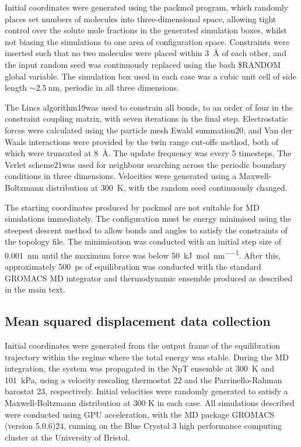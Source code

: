 Initial coordinates were generated using the packmol program, which randomly places set numbers of molecules into three-dimensional space, allowing tight control over the solute mole fractions in the generated simulation boxes, whilst not biasing the simulations to one area of configuration space. Constraints were inserted such that no two molecules were placed within \SI{3}{\angstrom} of each other, and the input random seed was continuously replaced using the bash \$RANDOM global variable. The simulation box used in each case was a cubic unit cell of side length $\sim \SI{2.5}{\nano\meter}$, periodic in all three dimensions.

The Lincs algorithm19was used to constrain all bonds, to an order of four in the constraint coupling matrix, with seven iterations in the final step. Electrostatic forces were calculated using the particle mesh Ewald summation20, and Van der Waals interactions were provided by the twin range cut-offs method, both of which were truncated at \SI{8}{\angstrom}. The update frequency was every 5 timesteps. The Verlet scheme21was used for neighbour searching across the periodic boundary conditions in three dimensions. Velocities were generated using a Maxwell-Boltzmann distribution at \SI{300}{\kelvin}, with the random seed continuously changed. 

The starting coordinates produced by packmol are not suitable for MD simulations immediately. The configuration must be energy minimised using the steepest descent method to allow bonds and angles to satisfy the constraints of the topology file. The minimisation was conducted with an initial step size of \SI{0.001}{\nano\meter} until the maximum force was below \SI{50}{\kilo\joule\per\mole\per\nano\meter}. After this, approximately \SI{500}{\pico\second} of equilibration was conducted with the standard GROMACS MD integrator and thermodynamic ensemble produced as described in the main text. 

\subsection{Mean squared displacement data collection}
Initial coordinates were generated from the output frame of the equilibration trajectory within the regime where the total energy was stable. During the MD integration, the system was propagated in the NpT ensemble at \SI{300}{\kelvin} and \SI{101}{\kilo\pascal}, using a velocity rescaling thermostat 22 and the Parrinello-Rahman barostat 23, respectively. Initial velocities were randomly generated to satisfy a Maxwell-Boltzmann distribution at 300 K in each case. All simulations described were conducted using GPU acceleration, with the MD package GROMACS (version 5.0.6)24, running on the Blue Crystal 3 high performance computing cluster at the University of Bristol.

